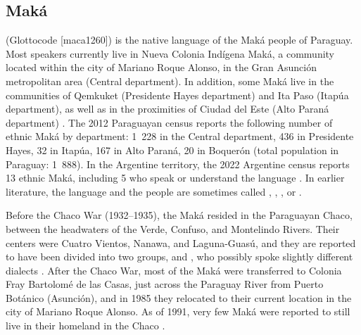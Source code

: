\subsection{Maká} \label{intro-mk}
 (Glottocode [maca1260]) is the native language of the Maká people of Paraguay. Most speakers currently live in Nueva Colonia Indígena Maká, a community located within the city of Mariano Roque Alonso, in the Gran Asunción metropolitan area (Central department). In addition, some Maká live in the communities of Qemkuket (Presidente Hayes department) and Ita Paso (Itapúa department), as well as in the proximities of Ciudad del Este (Alto Paraná department) \citep[128]{CM15}. The 2012 Paraguayan census \citep{ine-py-12} reports the following number of ethnic Maká by department: 1~228 in the Central department, 436 in Presidente Hayes, 32 in Itapúa, 167 in Alto Paraná, 20 in Boquerón (total population in Paraguay: 1~888). In the Argentine territory, the 2022 Argentine census reports 13 ethnic Maká, including 5 who speak or understand the language \citep{indec2024}. In earlier literature, the language and the people are sometimes called , , , or .

Before the Chaco War (1932--1935), the Maká resided in the Paraguayan Chaco, between the headwaters of the Verde, Confuso, and Montelindo Rivers. Their centers were Cuatro Vientos, Nanawa, and Laguna-Guasú, and they are reported to have been divided into two groups,  and , who possibly spoke slightly different dialects \citep[28]{JBe34,MCS72,AG94}. After the Chaco War, most of the Maká were transferred to Colonia Fray Bartolomé de las Casas, just across the Paraguay River from Puerto Botánico (Asunción), and in 1985 they relocated to their current location in the city of Mariano Roque Alonso. As of 1991, very few Maká were reported to still live in their homeland in the Chaco \citep[28--29]{AG94}.

